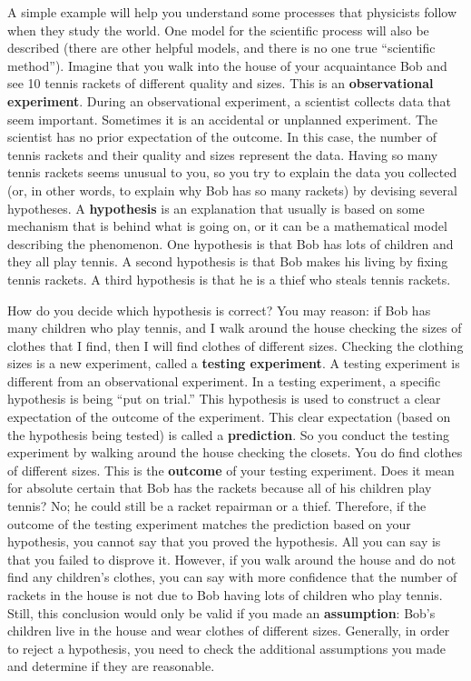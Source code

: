 A simple example will help you understand some processes that physicists follow when they study the world. One model for the scientific process will also be described (there are other helpful models, and there is no one true ``scientific method''). Imagine that you walk into the house of your acquaintance Bob and see 10 tennis rackets of different quality and sizes. This is an \textbf{observational experiment}. During an observational experiment, a scientist collects data that seem important. Sometimes it is an accidental or unplanned experiment. The scientist has no prior expectation of the outcome. In this case, the number of tennis rackets and their quality and sizes represent the data. Having so many tennis rackets seems unusual to you, so you try to explain the data you collected (or, in other words, to explain why Bob has so many rackets) by devising several hypotheses. A \textbf{hypothesis} is an explanation that usually is based on some mechanism that is behind what is going on, or it can be a mathematical model describing the phenomenon. One hypothesis is that Bob has lots of children and they all play tennis. A second hypothesis is that Bob makes his living by fixing tennis rackets. A third hypothesis is that he is a thief who steals tennis rackets.

How do you decide which hypothesis is correct? You may reason: if Bob has many children who play tennis, and I walk around the house checking the sizes of clothes that I find, then I will find clothes of different sizes. Checking the clothing sizes is a new experiment, called a \textbf{testing experiment}. A testing experiment is different from an observational experiment. In a testing experiment, a specific hypothesis is being ``put on trial.'' This hypothesis is used to construct a clear expectation of the outcome of the experiment. This clear expectation (based on the hypothesis being tested) is called a \textbf{prediction}. So you conduct the testing experiment by walking around the house checking the closets. You do find clothes of different sizes. This is the \textbf{outcome} of your testing experiment. Does it mean for absolute certain that Bob has the rackets because all of his children play tennis? No; he could still be a racket repairman or a thief. Therefore, if the outcome of the testing experiment matches the prediction based on your hypothesis, you cannot say that you proved the hypothesis. All you can say is that you failed to disprove it. However, if you walk around the house and do not find any children's clothes, you can say with more confidence that the number of rackets in the house is not due to Bob having lots of children who play tennis. Still, this conclusion would only be valid if you made an \textbf{assumption}: Bob's children live in the house and wear clothes of different sizes. Generally, in order to reject a hypothesis, you need to check the additional assumptions you made and determine if they are reasonable.

